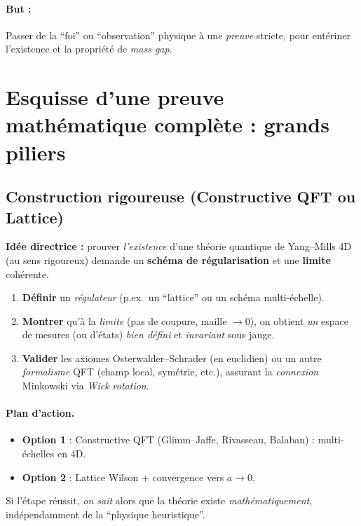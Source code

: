 \documentclass[11pt]{article}
\begin{document}
\paragraph{But :} Passer de la “foi” ou “observation” physique à une \emph{preuve} stricte, pour entériner l'existence et la propriété de \emph{mass gap}.

\section{Esquisse d’une preuve mathématique complète : grands piliers}

\subsection{Construction rigoureuse (Constructive QFT ou Lattice)}
\label{ssec:construction}

\noindent
\textbf{Idée directrice :} prouver \emph{l'existence} d'une théorie quantique de Yang--Mills 4D (au sens rigoureux) demande un \textbf{schéma de régularisation} et une \textbf{limite} cohérente.

\begin{enumerate}
  \item \textbf{Définir} un \emph{régulateur} (p.ex.\ un “lattice” ou un schéma multi-échelle).
  \item \textbf{Montrer} qu'à la \emph{limite} (pas de coupure, maille $\to 0$), on obtient \emph{un} espace de mesures (ou d'états) \emph{bien défini} et \emph{invariant} sous jauge.
  \item \textbf{Valider} les axiomes Osterwalder--Schrader (en euclidien) ou un autre \emph{formalisme} QFT (champ local, symétrie, etc.), assurant la \emph{connexion} Minkowski via \emph{Wick rotation}.
\end{enumerate}

\paragraph{Plan d'action.}
\begin{itemize}
  \item \textbf{Option 1} : Constructive QFT (Glimm--Jaffe, Rivasseau, Balaban) : multi-échelles en 4D.
  \item \textbf{Option 2} : Lattice Wilson + convergence vers $a\to0$.  
\end{itemize}
Si l'étape réussit, \emph{on sait} alors que la théorie existe \emph{mathématiquement}, indé\-pen\-dam\-ment de la “physique heuristique”.
\end{document}
